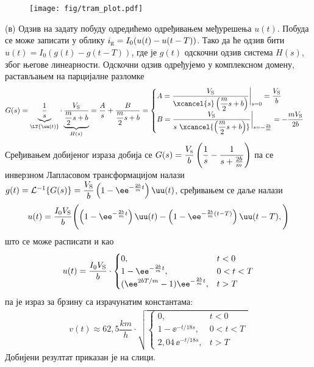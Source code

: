 \begin{figure}[b!]
    \centering
    \texttt{[image: fig/tram\_plot.pdf]}
    \caption{}
\end{figure}

    (в) Одзив на задату побуду одредићемо одређивањем међурешења $u(t)$. Побуда се може записати у облику 
    $i_{\rm g} = I_0 (u(t) - u(t - T))$. Тако да ће одзив бити 
    $u(t) = I_0 (g(t) - g(t - T))$, где је $g(t)$ одскочни одзив система $H(s)$, због његове линеарности. 
    Одскочни одзив одређујемо у комплексном домену, растављањем на парцијалне разломке
    \begin{align}
        G(s) = \underbrace{\dfrac{1}{s}}_{\LT{\uu(t)}} \cdot \underbrace{\dfrac{V_{\rm S}}{ \dfrac{m}{2} s + b } }_{H(s)}
        = \dfrac{A}{s} + \dfrac{B}{\dfrac{m}{2} s + b} 
        = 
        \begin{cases}
            A =  \dfrac{V_{\rm S}}{ \xcancel{s}\left( \dfrac{m}{2} s + b\right) } \bigg|_{s = 0} = \dfrac{V_{\rm S}}{b} \\
            B =  \dfrac{V_{\rm S}}{ {s} \,\, \xcancel{\left( \dfrac{m}{2} s + b\right) } } \bigg|_{s = -\frac{2b}{m}} = 
            -\dfrac{m V_{\rm S}}{2b}
        \end{cases}
    \end{align}
    Сређивањем добијеног израза добија се 
    $
    G(s) = \dfrac{V_{\rm s}}{b} \left( \dfrac{1}{s} - \dfrac{1}{s + \frac{2b}{m}} \right)$ \vspace*{1mm} 
    па се инверзном Лапласовом трансформацијом налази
    $g(t) = \mathcal{L}^{-1} \{ G(s) \} = \dfrac{V_{\rm S}}{b} \left(1 - \ee^{ -\frac{2b}{m} t } \right) \uu(t) $, 
    сређивањем се даље налази
    \begin{equation}
    u(t) = \dfrac{I_0 V_{\rm S}}{b} \Biggl(
        \left(1 - \ee^{ -\frac{2b}{m} t } \right) \uu(t) 
        -
        \left(1 - \ee^{ -\frac{2b}{m} (t - T)} \right) \uu(t - T),
    \Biggr)
    \end{equation}
    што се може расписати и као 
    \begin{eqnarray}
        u(t) = \dfrac{I_0 V_{\rm S}}{b} \cdot 
        \begin{cases}
            0 , & t < 0 \\
            1 - \ee^{-\frac{2b}{m}t} , & 0 < t < T \\
            ( \ee^{2bT/m} - 1) \ee^{-\frac{2b}{m}t} , & t > T 
        \end{cases}
    \end{eqnarray}
    па је израз за брзину са израчунатим константама: 
    \begin{eqnarray}
        v(t) \approx 62,5 \unit{\dfrac{km}{h}} \cdot 
        \sqrt{
        \begin{cases}
            0 , & t < 0 \\
            1 - \ee^{-t/18\unit{s}} , & 0 < t < T \\
            2,04\, \ee^{-t/18\unit{s}} , & t > T 
        \end{cases}
        }
    \end{eqnarray} 
    Добијени резултат приказан је на слици.




    
